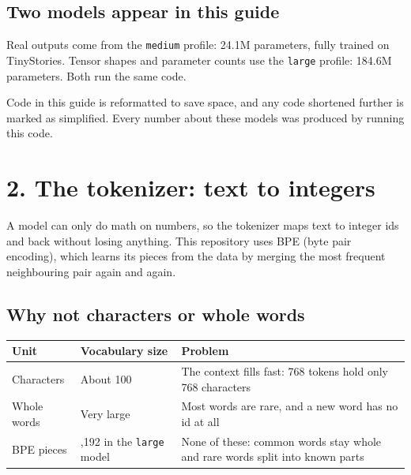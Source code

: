 \documentclass[11pt,a4paper]{article}
\newcommand{\code}[1]{\texttt{#1}}
\begin{document}
\subsection*{Two models appear in this guide}
{}

Real outputs come from the \code{medium} profile: 24.1M parameters, fully trained on TinyStories. Tensor shapes and parameter counts use the \code{large} profile: 184.6M parameters. Both run the same code.

Code in this guide is reformatted to save space, and any code shortened further is marked as simplified. Every number about these models was produced by running this code.

\section*{2. The tokenizer: text to integers}
{}

A model can only do math on numbers, so the tokenizer maps text to integer ids and back without losing anything. This repository uses BPE (byte pair encoding), which learns its pieces from the data by merging the most frequent neighbouring pair again and again.

\subsection*{Why not characters or whole words}
{}

{\small
\begin{longtable}{@{}>{\raggedright\arraybackslash}p{}>{\raggedright\arraybackslash}p{}>{\raggedright\arraybackslash}p{}@{}}
\toprule
\textbf{Unit} & \textbf{Vocabulary size} & \textbf{Problem} \\
\midrule
\endhead
Characters & About 100 & The context fills fast: 768 tokens hold only 768 characters \\
Whole words & Very large & Most words are rare, and a new word has no id at all \\
BPE pieces & 8,192 in the \code{large} model & None of these: common words stay whole and rare words split into known parts \\
\bottomrule
\end{longtable}
}
\end{document}
